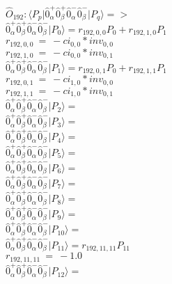 \documentclass[14pt]{article}
\begin{document}
    $\hat{O}_{192}:  \langle{P_p}\vert \hat{0}_{\alpha}^{+}\hat{0}_{\beta}^{+}\hat{0}_{\alpha}^{-}\hat{0}_{\beta}^{-} \vert{P_q}\rangle => $ \\ 
    $ \hat{0}_{\alpha}^{+}\hat{0}_{\beta}^{+}\hat{0}_{\alpha}^{-}\hat{0}_{\beta}^{-} \vert{P_{0}}\rangle = {r}_{192,0,0}P_{0}+{r}_{192,1,0}P_{1} $ \\ 
    ${r}_{192,0,0}\ =\ -{ci}_{0,0}*{inv}_{0,0} $ \\ 
    ${r}_{192,1,0}\ =\ -{ci}_{0,0}*{inv}_{0,1} $ \\ 
    $ \hat{0}_{\alpha}^{+}\hat{0}_{\beta}^{+}\hat{0}_{\alpha}^{-}\hat{0}_{\beta}^{-} \vert{P_{1}}\rangle = {r}_{192,0,1}P_{0}+{r}_{192,1,1}P_{1} $ \\ 
    ${r}_{192,0,1}\ =\ -{ci}_{1,0}*{inv}_{0,0} $ \\ 
    ${r}_{192,1,1}\ =\ -{ci}_{1,0}*{inv}_{0,1} $ \\ 
    $ \hat{0}_{\alpha}^{+}\hat{0}_{\beta}^{+}\hat{0}_{\alpha}^{-}\hat{0}_{\beta}^{-} \vert{P_{2}}\rangle =  $ \\ 
    $ \hat{0}_{\alpha}^{+}\hat{0}_{\beta}^{+}\hat{0}_{\alpha}^{-}\hat{0}_{\beta}^{-} \vert{P_{3}}\rangle =  $ \\ 
    $ \hat{0}_{\alpha}^{+}\hat{0}_{\beta}^{+}\hat{0}_{\alpha}^{-}\hat{0}_{\beta}^{-} \vert{P_{4}}\rangle =  $ \\ 
    $ \hat{0}_{\alpha}^{+}\hat{0}_{\beta}^{+}\hat{0}_{\alpha}^{-}\hat{0}_{\beta}^{-} \vert{P_{5}}\rangle =  $ \\ 
    $ \hat{0}_{\alpha}^{+}\hat{0}_{\beta}^{+}\hat{0}_{\alpha}^{-}\hat{0}_{\beta}^{-} \vert{P_{6}}\rangle =  $ \\ 
    $ \hat{0}_{\alpha}^{+}\hat{0}_{\beta}^{+}\hat{0}_{\alpha}^{-}\hat{0}_{\beta}^{-} \vert{P_{7}}\rangle =  $ \\ 
    $ \hat{0}_{\alpha}^{+}\hat{0}_{\beta}^{+}\hat{0}_{\alpha}^{-}\hat{0}_{\beta}^{-} \vert{P_{8}}\rangle =  $ \\ 
    $ \hat{0}_{\alpha}^{+}\hat{0}_{\beta}^{+}\hat{0}_{\alpha}^{-}\hat{0}_{\beta}^{-} \vert{P_{9}}\rangle =  $ \\ 
    $ \hat{0}_{\alpha}^{+}\hat{0}_{\beta}^{+}\hat{0}_{\alpha}^{-}\hat{0}_{\beta}^{-} \vert{P_{10}}\rangle =  $ \\ 
    $ \hat{0}_{\alpha}^{+}\hat{0}_{\beta}^{+}\hat{0}_{\alpha}^{-}\hat{0}_{\beta}^{-} \vert{P_{11}}\rangle = {r}_{192,11,11}P_{11} $ \\ 
    ${r}_{192,11,11}\ =\ -1.0 $ \\ 
    $ \hat{0}_{\alpha}^{+}\hat{0}_{\beta}^{+}\hat{0}_{\alpha}^{-}\hat{0}_{\beta}^{-} \vert{P_{12}}\rangle =  $ \\ 
\end{document}
